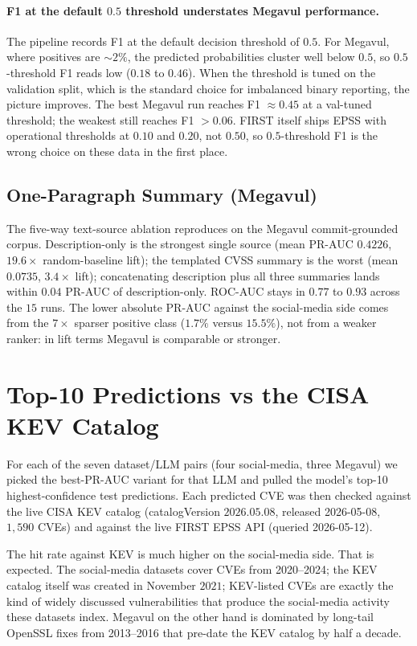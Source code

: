 \documentclass[11pt]{article}
\begin{document}
\paragraph{F1 at the default $0.5$ threshold understates Megavul performance.}
The pipeline records F1 at the default decision threshold of $0.5$.
For Megavul, where positives are $\sim 2\%$, the predicted
probabilities cluster well below $0.5$, so $0.5$-threshold F1 reads
low ($0.18$ to $0.46$). When the threshold is tuned on the validation
split, which is the standard choice for imbalanced binary reporting,
the picture improves. The best Megavul run reaches F1 $\approx 0.45$
at a val-tuned threshold; the weakest still reaches F1 $> 0.06$. FIRST
itself ships EPSS with operational thresholds at $0.10$ and $0.20$,
not $0.50$, so $0.5$-threshold F1 is the wrong choice on these data
in the first place.

\subsection{One-Paragraph Summary (Megavul)}

The five-way text-source ablation reproduces on the Megavul
commit-grounded corpus. Description-only is the strongest single
source (mean PR-AUC $0.4226$, $19.6\times$ random-baseline lift); the
templated CVSS summary is the worst (mean $0.0735$, $3.4\times$ lift);
concatenating description plus all three summaries lands within
$0.04$ PR-AUC of description-only. ROC-AUC stays in $0.77$ to $0.93$
across the $15$ runs. The lower absolute PR-AUC against the
social-media side comes from the $7\times$ sparser positive class
($1.7\%$ versus $15.5\%$), not from a weaker ranker: in lift terms
Megavul is comparable or stronger.

\section{Top-10 Predictions vs the CISA KEV Catalog}

For each of the seven dataset/LLM pairs (four social-media, three
Megavul) we picked the best-PR-AUC variant for that LLM and pulled
the model's top-10 highest-confidence test predictions. Each predicted
CVE was then checked against the live CISA KEV catalog
(catalogVersion $2026.05.08$, released 2026-05-08, $1{,}590$ CVEs)
and against the live FIRST EPSS API (queried 2026-05-12).

The hit rate against KEV is much higher on the social-media side.
That is expected. The social-media datasets cover CVEs from
2020--2024; the KEV catalog itself was created in November $2021$;
KEV-listed CVEs are exactly the kind of widely discussed vulnerabilities
that produce the social-media activity these datasets index. Megavul
on the other hand is dominated by long-tail OpenSSL fixes from
2013--2016 that pre-date the KEV catalog by half a decade.
\end{document}
